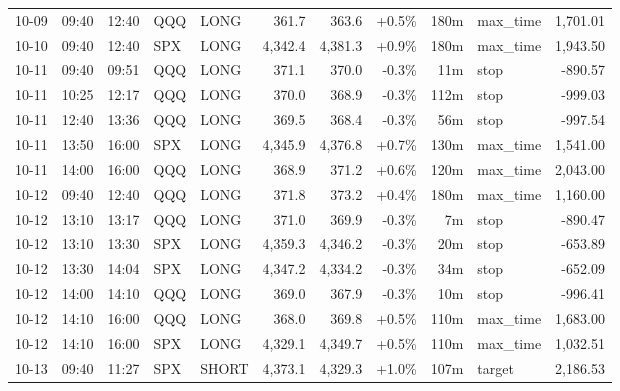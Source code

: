 \documentclass[11pt,a4paper,twoside]{article}
\begin{document}
\begin{center}
\begin{longtable}{>{\color{txtmain}}l l l l l r r r r >{\color{txtmain}}l r}
10-09 & 09:40 & 12:40 & QQQ & LONG & 361.7 & 363.6 & \textcolor{wingreen}{+0.5\%} & 180m & max\_time & \textcolor{wingreen}{1,701.01} \\
10-10 & 09:40 & 12:40 & SPX & LONG & 4,342.4 & 4,381.3 & \textcolor{wingreen}{+0.9\%} & 180m & max\_time & \textcolor{wingreen}{1,943.50} \\
10-11 & 09:40 & 09:51 & QQQ & LONG & 371.1 & 370.0 & \textcolor{lossred}{-0.3\%} & 11m & stop & \textcolor{lossred}{-890.57} \\
10-11 & 10:25 & 12:17 & QQQ & LONG & 370.0 & 368.9 & \textcolor{lossred}{-0.3\%} & 112m & stop & \textcolor{lossred}{-999.03} \\
10-11 & 12:40 & 13:36 & QQQ & LONG & 369.5 & 368.4 & \textcolor{lossred}{-0.3\%} & 56m & stop & \textcolor{lossred}{-997.54} \\
10-11 & 13:50 & 16:00 & SPX & LONG & 4,345.9 & 4,376.8 & \textcolor{wingreen}{+0.7\%} & 130m & max\_time & \textcolor{wingreen}{1,541.00} \\
10-11 & 14:00 & 16:00 & QQQ & LONG & 368.9 & 371.2 & \textcolor{wingreen}{+0.6\%} & 120m & max\_time & \textcolor{wingreen}{2,043.00} \\
10-12 & 09:40 & 12:40 & QQQ & LONG & 371.8 & 373.2 & \textcolor{wingreen}{+0.4\%} & 180m & max\_time & \textcolor{wingreen}{1,160.00} \\
10-12 & 13:10 & 13:17 & QQQ & LONG & 371.0 & 369.9 & \textcolor{lossred}{-0.3\%} & 7m & stop & \textcolor{lossred}{-890.47} \\
10-12 & 13:10 & 13:30 & SPX & LONG & 4,359.3 & 4,346.2 & \textcolor{lossred}{-0.3\%} & 20m & stop & \textcolor{lossred}{-653.89} \\
10-12 & 13:30 & 14:04 & SPX & LONG & 4,347.2 & 4,334.2 & \textcolor{lossred}{-0.3\%} & 34m & stop & \textcolor{lossred}{-652.09} \\
10-12 & 14:00 & 14:10 & QQQ & LONG & 369.0 & 367.9 & \textcolor{lossred}{-0.3\%} & 10m & stop & \textcolor{lossred}{-996.41} \\
10-12 & 14:10 & 16:00 & QQQ & LONG & 368.0 & 369.8 & \textcolor{wingreen}{+0.5\%} & 110m & max\_time & \textcolor{wingreen}{1,683.00} \\
10-12 & 14:10 & 16:00 & SPX & LONG & 4,329.1 & 4,349.7 & \textcolor{wingreen}{+0.5\%} & 110m & max\_time & \textcolor{wingreen}{1,032.51} \\
10-13 & 09:40 & 11:27 & SPX & SHORT & 4,373.1 & 4,329.3 & \textcolor{wingreen}{+1.0\%} & 107m & target & \textcolor{wingreen}{2,186.53} \\

\end{longtable}
\end{center}
\end{document}
